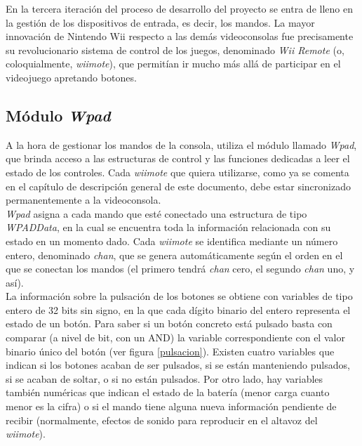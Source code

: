 



En la tercera iteración del proceso de desarrollo del proyecto se entra de lleno en la gestión de los dispositivos de entrada, es decir, los mandos. La mayor innovación de Nintendo Wii respecto a las demás videoconsolas fue precisamente su revolucionario sistema de control de los juegos, denominado \emph{Wii Remote} (o, coloquialmente, \emph{wiimote}), que permitían ir mucho más allá de participar en el videojuego apretando botones.

\subsection{Módulo \emph{Wpad}}

A la hora de gestionar los mandos de la consola,  utiliza el módulo llamado \emph{Wpad}, que brinda acceso a las estructuras de control y las funciones dedicadas a leer el estado de los controles. Cada \emph{wiimote} que quiera utilizarse, como ya se comenta en el capítulo de descripción general de este documento, debe estar sincronizado permanentemente a la videoconsola.\\

\emph{Wpad} asigna a cada mando que esté conectado una estructura de tipo \emph{WPADData}, en la cual se encuentra toda la información relacionada con su estado en un momento dado. Cada \emph{wiimote} se identifica mediante un número entero, denominado \emph{chan}, que se genera automáticamente según el orden en el que se conectan los mandos (el primero tendrá \emph{chan} cero, el segundo \emph{chan} uno, y así).\\

La información sobre la pulsación de los botones se obtiene con variables de tipo entero de 32 bits sin signo, en la que cada dígito binario del entero representa el estado de un botón. Para saber si un botón concreto está pulsado basta con comparar (a nivel de bit, con un AND) la variable correspondiente con el valor binario único del botón (ver figura \ref{pulsacion}). Existen cuatro variables que indican si los botones acaban de ser pulsados, si se están manteniendo pulsados, si se acaban de soltar, o si no están pulsados. Por otro lado, hay variables también numéricas que indican el estado de la batería (menor carga cuanto menor es la cifra) o si el mando tiene alguna nueva información pendiente de recibir (normalmente, efectos de sonido para reproducir en el altavoz del \emph{wiimote}).\\

